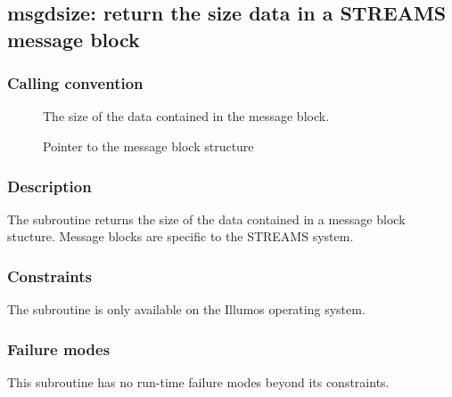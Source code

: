 \clearpage
{}
{}
\label{subr:msgdsize}
\subsection*{msgdsize: return the size data in a STREAMS message block }

\subsubsection*{Calling convention}

\begin{description}
\item[] The size of the data contained in the
  message block.
\item[] Pointer to the message block structure
\end{description}

\subsubsection*{Description}

The  subroutine returns the size of the data
contained in a message block stucture.  Message blocks are specific to
the STREAMS system.

\subsubsection*{Constraints}

The  subroutine is only available on the Illumos
operating system.

\subsubsection*{Failure modes}

This subroutine has no run-time failure modes beyond its constraints.
